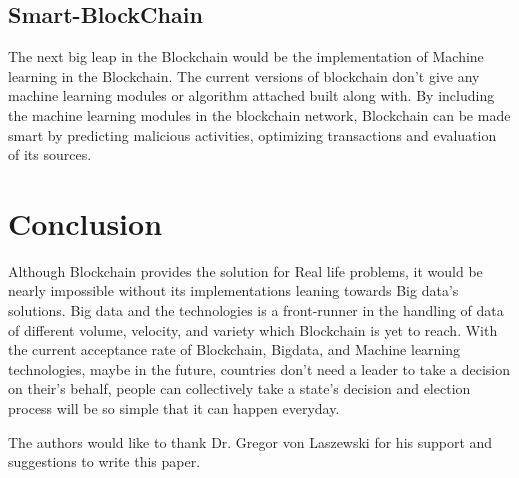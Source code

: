 \documentclass[sigconf]{acmart}
\begin{document}
\subsection{Smart-BlockChain}
The next big leap in the Blockchain would be the implementation of Machine learning in the Blockchain. The current versions of blockchain don't give any machine learning modules or algorithm attached built along with. By including the machine learning modules in the blockchain network, Blockchain can be made smart by predicting malicious activities, optimizing transactions and evaluation of its sources.


\section{Conclusion}
Although Blockchain provides the solution for  Real life problems, it would be nearly impossible without its implementations leaning towards Big data's solutions. Big data and the technologies is a front-runner in the handling of data of different volume, velocity, and variety which Blockchain is yet to reach. With the current acceptance rate of Blockchain, Bigdata, and Machine learning technologies, maybe in the future, countries don't need a leader to take a decision on their's behalf, people can collectively take a state's decision and election process will be so simple that it can happen everyday.



\begin{acks}

  The authors would like to thank Dr. Gregor von Laszewski for his
  support and suggestions to write this paper.

\end{acks}


 
\end{document}
